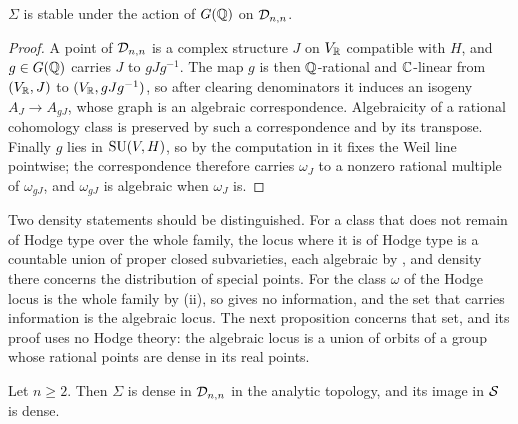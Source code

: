 \begin{lemma}\label{lem:Ginvariance}
$\Sigma$ is stable under the action of $G(\mathbb{Q})$ on $\mathcal{D}_{n,n}$.
\end{lemma}

\begin{proof}
A point of $\mathcal{D}_{n,n}$ is a complex structure $J$ on $V_{\mathbb{R}}$ compatible with
$H$, and $g\in G(\mathbb{Q})$ carries $J$ to $gJg^{-1}$. The map $g$ is then
$\mathbb{Q}$-rational and $\mathbb{C}$-linear from $(V_{\mathbb{R}},J)$ to $(V_{\mathbb{R}},gJg^{-1})$, so
after clearing denominators it induces an isogeny $A_{J}\to A_{gJ}$, whose
graph is an algebraic correspondence. Algebraicity of a rational cohomology
class is preserved by such a correspondence and by its transpose. Finally $g$
lies in $\operatorname{SU}(V,H)$, so by the computation in  it fixes
the Weil line pointwise; the correspondence therefore carries $\omega_{J}$ to
a nonzero rational multiple of $\omega_{gJ}$, and $\omega_{gJ}$ is algebraic
when $\omega_{J}$ is.
\end{proof}

Two density statements should be distinguished. For a class that does not
remain of Hodge type over the whole family, the locus where it is of Hodge
type is a countable union of proper closed subvarieties, each algebraic by
, and density there concerns the distribution of special
points. For the class $\omega$ of  the Hodge locus is the
whole family by (ii), so  gives no
information, and the set that carries information is the algebraic locus. The
next proposition concerns that set, and its proof uses no Hodge theory: the
algebraic locus is a union of orbits of a group whose rational points are
dense in its real points.

\begin{proposition}\label{prop:densealg}
Let $n\ge2$. Then $\Sigma$ is dense in $\mathcal{D}_{n,n}$ in the analytic topology,
and its image in $\mathcal{S}$ is dense.
\end{proposition}

